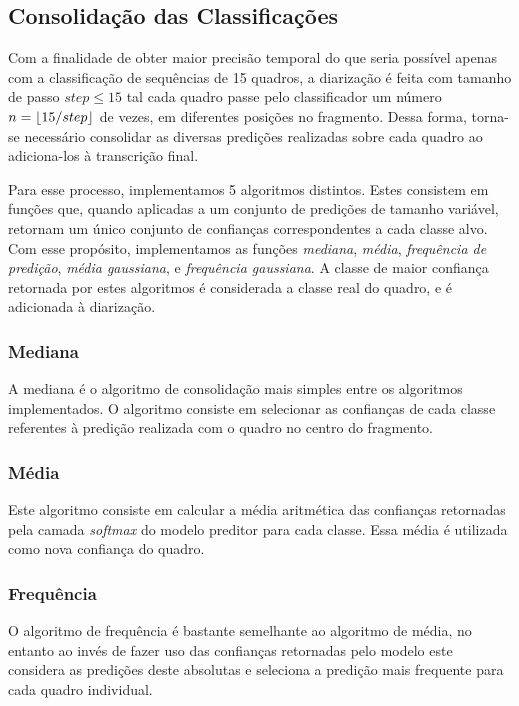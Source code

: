 \subsection{Consolidação das Classificações}
\label{sec:class-commit}

Com a finalidade de obter maior precisão temporal do que seria possível apenas com a classificação de sequências de 15 quadros, a diarização é feita com tamanho de passo $step \leq 15$ tal cada quadro passe pelo classificador um número $n = \left\lfloor 15 / step \right\rfloor$ de vezes, em diferentes posições no fragmento.
Dessa forma, torna-se necessário consolidar as diversas predições realizadas sobre cada quadro ao adiciona-los à transcrição final.

Para esse processo, implementamos 5 algoritmos distintos. 
Estes consistem em funções que, quando aplicadas a um conjunto de predições de tamanho variável, retornam um único conjunto de confianças correspondentes a cada classe alvo.
Com esse propósito, implementamos as funções \textit{mediana}, \textit{média}, \textit{frequência de predição}, \textit{média gaussiana}, e \textit{frequência gaussiana}.
A classe de maior confiança retornada por estes algoritmos é considerada a classe real do quadro, e é adicionada à diarização.

\subsubsection{Mediana}

A mediana é o algoritmo de consolidação mais simples entre os algoritmos implementados.
O algoritmo consiste em selecionar as confianças de cada classe referentes à predição realizada com o quadro no centro do fragmento.

\subsubsection{Média}

Este algoritmo consiste em calcular a média aritmética das confianças retornadas pela camada \textit{softmax} do modelo preditor para cada classe.
Essa média é utilizada como nova confiança do quadro.

\subsubsection{Frequência}

O algoritmo de frequência é bastante semelhante ao algoritmo de média, no entanto ao invés de fazer uso das confianças retornadas pelo modelo este considera as predições deste absolutas e seleciona a predição mais frequente para cada quadro individual.

